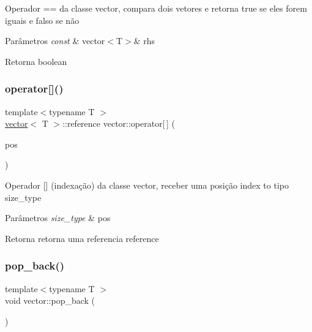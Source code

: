 Operador == da classe vector, compara dois vetores e retorna true se eles forem iguais e falso se não 
\begin{DoxyParams}{Parâmetros}
{\em const} & vector$<$\+T$>$\& rhs \\
\hline
\end{DoxyParams}
\begin{DoxyReturn}{Retorna}
boolean 
\end{DoxyReturn}
\mbox{\label{classsc_1_1vector_a6aa5376ac0bca60a4ef154095733591c}} 
\subsubsection{\texorpdfstring{operator[]()}{operator[]()}}
{\footnotesize\ttfamily template$<$typename T $>$ \\
\mbox{\hyperlink{classsc_1_1vector}{vector}}$<$ T $>$\+::reference vector\+::operator\mbox{[}$\,$\mbox{]} (\begin{DoxyParamCaption}\item[{size\+\_\+type}]{pos }\end{DoxyParamCaption})}

Operador \mbox{[}\mbox{]} (indexação) da classe vector, receber uma posição index to tipo size\+\_\+type 
\begin{DoxyParams}{Parâmetros}
{\em size\+\_\+type} & pos \\
\hline
\end{DoxyParams}
\begin{DoxyReturn}{Retorna}
retorna uma referencia reference 
\end{DoxyReturn}
\mbox{\label{classsc_1_1vector_a1d32a5d62fa75707a4a6a5781e1030ea}} 
\subsubsection{\texorpdfstring{pop\+\_\+back()}{pop\_back()}}
{\footnotesize\ttfamily template$<$typename T $>$ \\
void vector\+::pop\+\_\+back (\begin{DoxyParamCaption}{ }\end{DoxyParamCaption})}

